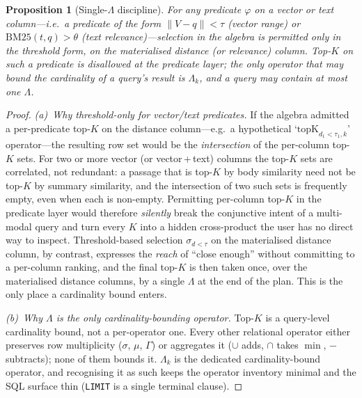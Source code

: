 \documentclass[sigconf]{acmart}
\theoremstyle{plain}
\newtheorem{proposition}[theorem]{Proposition}
\theoremstyle{definition}
\theoremstyle{remark}
\begin{document}
\begin{proposition}[Single-$\Lambda$ discipline]\label{prop:single-lambda}
For any predicate $\varphi$ on a vector or text column---i.e.\ a
predicate of the form $\lVert V - q \rVert < \tau$ (vector range) or
$\mathrm{BM25}(t, q) > \theta$ (text relevance)---selection in the
algebra is permitted \emph{only} in the threshold form, on the
materialised distance (or relevance) column. Top-$K$ on such a
predicate is \emph{disallowed} at the predicate layer; the only
operator that may bound the cardinality of a query's result is
$\Lambda_k$, and a query may contain \emph{at most one} $\Lambda$.
\end{proposition}

\begin{proof}
\emph{(a)~Why threshold-only for vector/text predicates.}
If the algebra admitted a per-predicate top-$K$ on the distance
column---e.g.\ a hypothetical `$\mathrm{topK}_{d_1<\tau_1, k}$'
operator---the resulting row set would be the \emph{intersection}
of the per-column top-$K$ sets. For two or more vector (or
vector\,+\,text) columns the top-$K$ sets are correlated, not
redundant: a passage that is top-$K$ by body similarity need not
be top-$K$ by summary similarity, and the intersection of two such
sets is frequently empty, even when each is non-empty. Permitting
per-column top-$K$ in the predicate layer would therefore
\emph{silently} break the conjunctive intent of a multi-modal
query and turn every $K$ into a hidden cross-product the user has
no direct way to inspect. Threshold-based selection
$\sigma_{d < \tau}$ on the materialised distance column, by
contrast, expresses the \emph{reach} of ``close enough'' without
committing to a per-column ranking, and the final top-$K$ is then
taken once, over the materialised distance columns, by a single
$\Lambda$ at the end of the plan. This is the only place a
cardinality bound enters.

\emph{(b)~Why $\Lambda$ is the only cardinality-bounding operator.}
Top-$K$ is a query-level cardinality bound, not a per-operator one.
Every other relational operator either preserves row multiplicity
($\sigma$, $\mu$, $\Gamma$) or aggregates it ($\cup$ adds, $\cap$
takes $\min$, $-$ subtracts); none of them bounds it. $\Lambda_k$
is the dedicated cardinality-bound operator, and recognising it as
such keeps the operator inventory minimal and the SQL surface thin
(\texttt{LIMIT} is a single terminal clause).


\end{proof}
\end{document}

